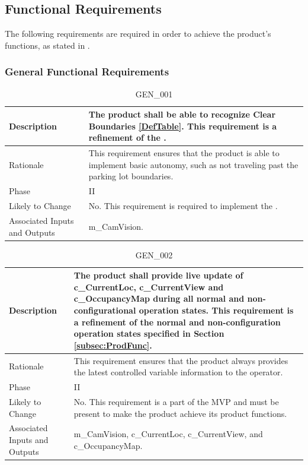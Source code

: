 \documentclass{article}
\begin{document}
\newpage

\subsection{Functional Requirements}
\label{sec:funcReqs}
The following requirements are required in order to achieve the product's functions, as stated in .

\subsubsection{General Functional Requirements}

\begin{table}[!h]
\begin{center}
\caption {GEN\_001} 
\label{GEN_001}
\begin{tabular}{ | m{3cm} | m{11cm} | }
\hline
Description & The product shall be able to recognize Clear Boundaries \ref{DefTable}. This requirement is a refinement of the \nameref{Autonomous Explore State}. \\
\hline
Rationale & This requirement ensures that the product is able to implement basic autonomy, such as not traveling past the parking lot boundaries. \\
\hline
Phase & II \\
\hline
Likely to Change & No. This requirement is required to implement the \nameref{Autonomous Explore State}. \\
\hline
Associated Inputs and Outputs & m\_CamVision. \\
\hline
\end{tabular}
\end{center}
\end{table}


\begin{table}[!h]
\begin{center}
\caption {GEN\_002} 
\label{GEN_002}
\begin{tabular}{ | m{3cm} | m{11cm} | } 
\hline
Description & The product shall provide live update of c\_CurrentLoc, c\_CurrentView and c\_OccupancyMap during all normal and non-configurational operation states. This requirement is a refinement of the normal and non-configuration operation states specified in Section \ref{subsec:ProdFunc}. \\
\hline
Rationale & This requirement ensures that the product always provides the latest controlled variable information to the operator. \\
\hline
Phase & II \\
\hline
Likely to Change & No. This requirement is a part of the MVP and must be present to make the product achieve its product functions. \\
\hline
Associated Inputs and Outputs & m\_CamVision, c\_CurrentLoc, c\_CurrentView, and c\_OccupancyMap. \\
\hline
\end{tabular}
\end{center}
\end{table}
\end{document}
